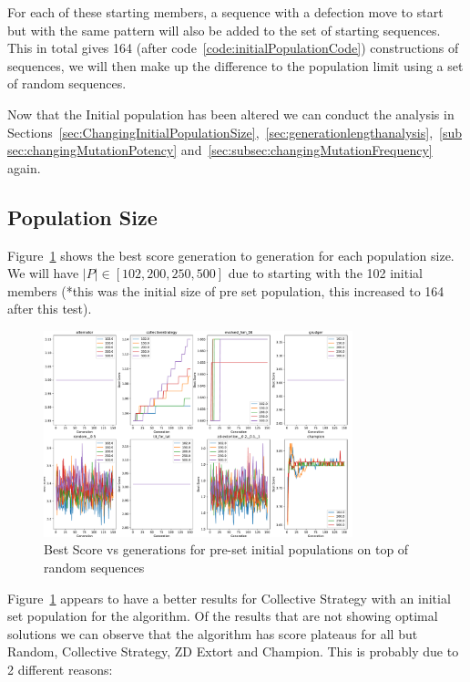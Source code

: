 For each of these starting members, a sequence with a defection move to start but with the same pattern will also be added to the set of starting sequences.
This in total gives 164 (after code~\ref{code:initialPopulationCode}) constructions of sequences, we will then make up the difference to the population limit using a set of random sequences.

Now that the Initial population has been altered we can conduct the analysis in Sections~\ref{sec:ChangingInitialPopulationSize},~\ref{sec:generationlengthanalysis},~\ref{subsec:changingMutationPotency} and~\ref{sec:subsec:changingMutationFrequency} again.

\subsection{Population Size}\label{subsec:populationSize}
Figure~\ref{fig:NEW-INIT-POP-bs-v-gen-all} shows the best score generation to generation for each population size.
We will have \(|P| \in [102,200,250,500]\) due to starting with the 102 initial members (*this was the initial size of pre set population, this increased to 164 after this test).

\begin{figure}[h]
    \includegraphics[width=0.8\textwidth, keepaspectratio, center]{./img/plots/NEW_INIT_POP_bs_v_gen_all_old.pdf}
    \caption{Best Score vs generations for pre-set initial populations on top of random sequences}\label{fig:NEW-INIT-POP-bs-v-gen-all}
\end{figure}

Figure~\ref{fig:NEW-INIT-POP-bs-v-gen-all} appears to have a better results for Collective Strategy with an initial set population for the algorithm.
Of the results that are not showing optimal solutions we can observe that the algorithm has score plateaus for all but Random, Collective Strategy, ZD Extort and Champion.
This is probably due to 2 different reasons:

